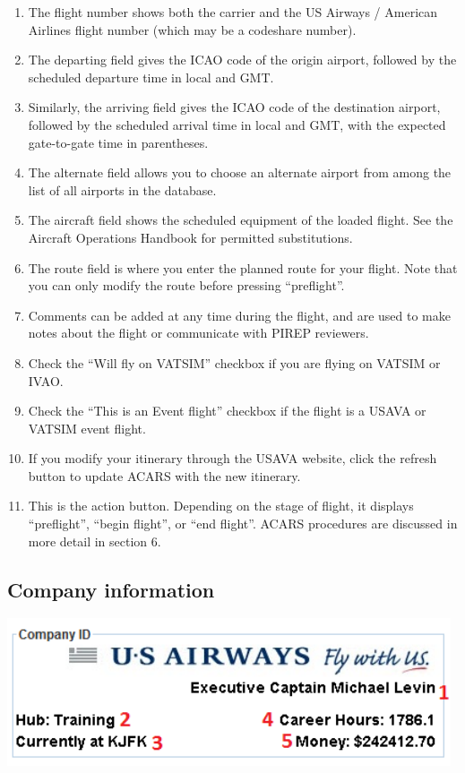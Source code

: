 \documentclass[12pt]{article}
\begin{document}
\begin{enumerate}
\item{The flight number shows both the carrier and the US Airways / American Airlines flight number (which may be a codeshare number). }
\item{The departing field gives the ICAO code of the origin airport, followed by the scheduled departure time in local and GMT. }
\item{Similarly, the arriving field gives the ICAO code of the destination airport, followed by the scheduled arrival time in local and GMT, with the expected gate-to-gate time in parentheses.}
\item{The alternate field allows you to choose an alternate airport from among the list of all airports in the database.}
\item{The aircraft field shows the scheduled equipment of the loaded flight. See the Aircraft Operations Handbook for permitted substitutions.}
\item{The route field is where you enter the planned route for your flight. Note that you can only modify the route before pressing “preflight”.}
\item{Comments can be added at any time during the flight, and are used to make notes about the flight or communicate with PIREP reviewers.}
\item{Check the “Will fly on VATSIM” checkbox if you are flying on VATSIM or IVAO.}
\item{Check the “This is an Event flight” checkbox if the flight is a USAVA or VATSIM event flight.}
\item{If you modify your itinerary through the USAVA website, click the refresh button to update ACARS with the new itinerary.}
\item{This is the action button. Depending on the stage of flight, it displays “preflight”, “begin flight”, or “end flight”. ACARS procedures are discussed in more detail in section 6.}
\end{enumerate}

\subsection{Company information}

\begin{center}
\includegraphics[scale=1]{Image7.pdf}
\end{center} 
\end{document}
